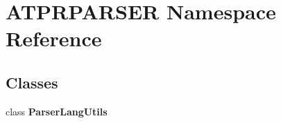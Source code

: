 \hypertarget{namespace_a_t_p_r_p_a_r_s_e_r}{}\section{A\+T\+P\+R\+P\+A\+R\+S\+ER Namespace Reference}
\label{namespace_a_t_p_r_p_a_r_s_e_r}
\subsection*{Classes}
\begin{DoxyCompactItemize}
\item 
class {\bfseries Parser\+Lang\+Utils}
\end{DoxyCompactItemize}
